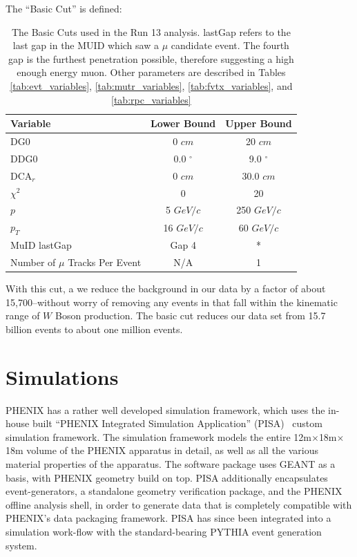 {\noindent}The ``Basic Cut'' is defined:
\begin{table}[ht]
  \centering
  \begin{tabular}{l c c}
    \toprule
    \textbf{Variable} & \textbf{Lower Bound} & \textbf{Upper Bound} \\
    \midrule
    DG0 & 0 $cm$ & 20 $cm$ \\
    DDG0 & 0.0 $^\circ$ & 9.0 $^\circ$ \\
    DCA$_r$ & 0 $cm$ & 30.0 $cm$ \\
    $\chi^2$ & 0 & 20 \\
    $p$ & 5 $GeV/c$ & 250 $GeV/c$ \\
    $p_T$ & 16 $GeV/c$ & 60 $GeV/c$ \\ 
    MuID lastGap & Gap 4 & * \\ 
    Number of $\mu$ Tracks Per Event & N/A & 1 \\
    \bottomrule
  \end{tabular}
  \caption{ 
    The Basic Cuts used in the Run 13 analysis. lastGap refers to the last gap
    in the MUID which saw a $\mu$ candidate event. The fourth gap is the
    furthest penetration possible, therefore suggesting a high enough energy
    muon.  Other parameters are described in Tables \ref{tab:evt_variables},
    \ref{tab:mutr_variables}, \ref{tab:fvtx_variables}, and
    \ref{tab:rpc_variables}
  }
  \label{tab:basic_cut}
\end{table}

With this cut, a we reduce the background in our data by a factor of about
15,700--without worry of removing any events in that fall within the kinematic
range of $W$ Boson production. The basic cut reduces our data set from 15.7
billion events to about one million events.

\clearpage
\section{Simulations}
\label{sec:simulations}

PHENIX has a rather well developed simulation framework, which uses the in-house
built ``PHENIX Integrated Simulation Application'' (PISA)~\cite{Maguire1997}
custom simulation framework. The simulation framework models the entire
12m$\times$18m$\times$18m volume of the PHENIX apparatus in detail, as well as
all the various material properties of the apparatus. The software package uses
GEANT as a basis, with PHENIX geometry build on top. PISA additionally
encapsulates event-generators, a standalone geometry verification package, and
the PHENIX offline analysis shell, in order to generate data that is completely
compatible with PHENIX's data packaging framework. PISA has since been
integrated into a simulation work-flow with the standard-bearing PYTHIA event
generation system.


